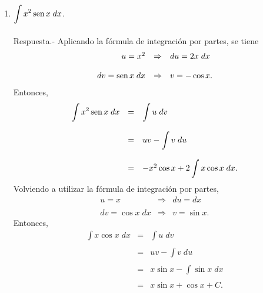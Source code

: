 \begin{enumerate}[\bfseries 1.]
	\item $\displaystyle\int x^2\mathop{\mbox{\normalfont sen}}\nolimits x \; dx$.\\\\
	    Respuesta.-\; Aplicando la fórmula de integración por partes, se tiene
	    $$\begin{array}{rcl}
		u=x^2 &\Rightarrow& du=2x\; dx\\\\
		dv=\mathop{\mbox{\normalfont sen}}\nolimits x\; dx &\Rightarrow& v=-\cos x.
	    \end{array}$$
	    Entonces,
	    $$\begin{array}{rcl}
		\displaystyle\int x^2\mathop{\mbox{\normalfont sen}}\nolimits x\; dx &=& \displaystyle\int u\; dv\\\\
					       &=& uv - \displaystyle\int v\; du\\\\
					       &=& -x^2\cos x + 2\displaystyle\int x \cos x\; dx.
	    \end{array}$$
	    Volviendo a utilizar la fórmula de integración por partes,
	    $$\begin{array}{rcl}
		u=x &\Rightarrow& du=dx\\\\
		dv=\cos x\; dx &\Rightarrow& v=\sin x.
	    \end{array}$$
	    Entonces,
	    $$\begin{array}{rcl}
		\displaystyle\int x\cos x\; dx &=& \displaystyle\int u\; dv\\\\
					       &=& uv - \displaystyle\int v\; du\\\\
					       &=& x\sin x - \displaystyle\int \sin x\; dx\\\\
					       &=& x\sin x + \cos x + C.
	    \end{array}$$
	    \vspace{0.5cm}


\end{enumerate}

